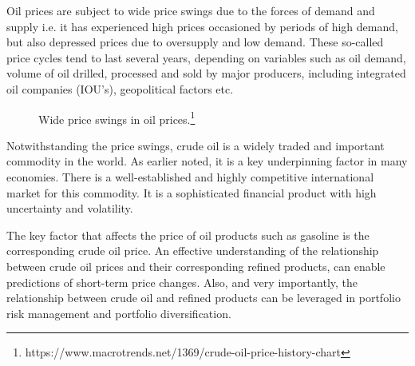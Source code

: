 \documentclass[a4paper,10pt]{article}
\begin{document}
Oil prices are subject to wide price swings due to the forces of demand and supply i.e. it has experienced high prices occasioned by periods of high demand, but also depressed prices due to oversupply and low demand. These so-called price cycles tend to last several years, depending on variables such as oil demand, volume of oil drilled, processed and sold by major producers, including integrated oil companies (IOU's), geopolitical factors etc.

\begin{figure}[h]
    \centering
	\noindent{}
	\caption[Oil Price]{Wide price swings in oil prices.\footnote{https://www.macrotrends.net/1369/crude-oil-price-history-chart}}
    \label{fig:oilprice1}
\end{figure}

Notwithstanding the price swings, crude oil is a widely traded and important commodity in the world. As earlier noted, it is a key underpinning factor in many economies. There is a well-established and highly competitive international market for this commodity. It is a sophisticated financial product with high uncertainty and volatility.\newline

The key factor that affects the price of oil products such as gasoline is the corresponding crude oil price. An effective understanding of the relationship between crude oil prices and their corresponding refined products, can enable predictions of short-term price changes. Also, and very importantly, the relationship between crude oil and refined products can be leveraged in portfolio risk management and portfolio diversification.\newline
\end{document}
